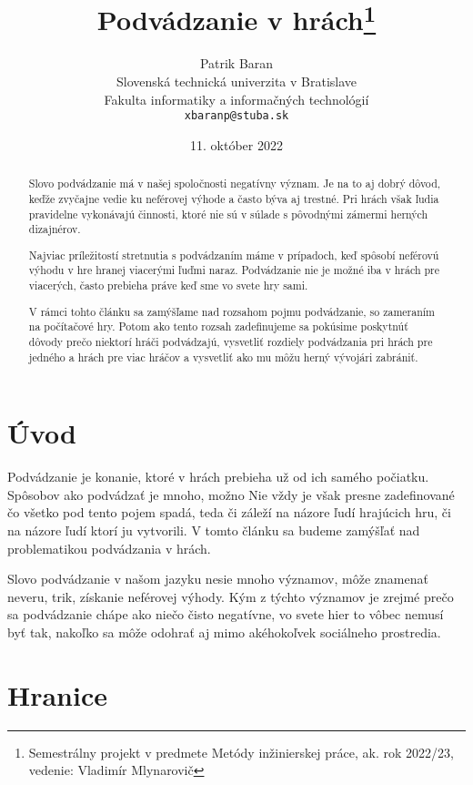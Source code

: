 \documentclass[10pt, oneside, slovak,a4paper]{article}
\title{Podvádzanie v hrách\thanks{Semestrálny projekt v predmete Metódy inžinierskej práce, ak. rok 2022/23, vedenie: Vladimír Mlynarovič}} %
\author{Patrik Baran\\[2pt]
	{\small Slovenská technická univerzita v Bratislave}\\
	{\small Fakulta informatiky a informačných technológií}\\
	{\small \texttt{xbaranp@stuba.sk}}
	}
\date{\small 11. október 2022} %
\begin{document}
\maketitle

\begin{abstract}
Slovo podvádzanie má v našej spoločnosti negatívny význam. Je na to aj dobrý dôvod, keďže zvyčajne vedie ku neférovej výhode a často býva aj trestné. Pri hrách však ľudia pravidelne vykonávajú činnosti, ktoré nie sú v súlade s pôvodnými zámermi herných dizajnérov.

Najviac príležitostí stretnutia s podvádzaním máme v prípadoch, keď spôsobí neférovú výhodu v hre hranej viacerými ľuďmi naraz. Podvádzanie nie je možné iba v hrách pre viacerých, často prebieha práve keď sme vo svete hry sami.

V rámci tohto článku sa zamýšľame nad rozsahom pojmu podvádzanie, so zameraním na počítačové hry. Potom ako tento rozsah zadefinujeme sa pokúsime poskytnúť dôvody prečo niektorí hráči podvádzajú, vysvetliť rozdiely podvádzania pri hrách pre jedného a hrách pre viac hráčov a vysvetliť ako mu môžu herný vývojári zabrániť.
\end{abstract}

\newpage


\section{Úvod}

Podvádzanie je konanie, ktoré v hrách prebieha už od ich samého počiatku. Spôsobov ako podvádzať je mnoho, možno 
%
%
Nie vždy je však presne zadefinované čo všetko pod tento pojem spadá, teda či záleží na názore ľudí hrajúcich hru, či na názore ľudí ktorí ju vytvorili. V tomto článku sa budeme zamýšľať nad problematikou podvádzania v hrách.

Slovo podvádzanie v našom jazyku nesie mnoho významov, môže znamenať neveru, trik, získanie neférovej výhody. Kým z týchto významov je zrejmé prečo sa podvádzanie chápe ako niečo čisto negatívne, vo svete hier to vôbec nemusí byť tak, nakoľko sa môže odohrať aj mimo akéhokoľvek sociálneho prostredia.


\section{Hranice}
\end{document}
